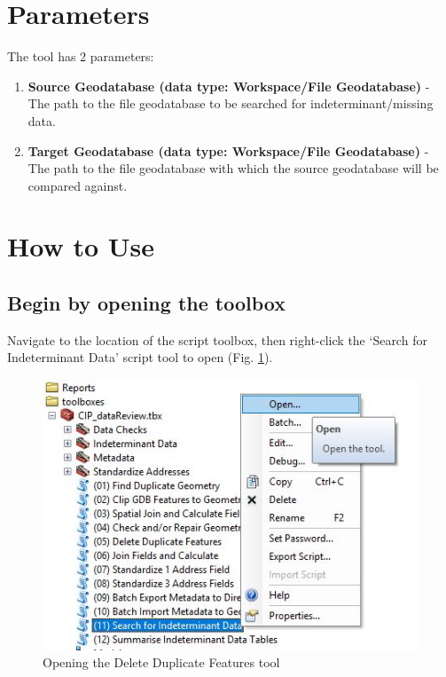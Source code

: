\documentclass[openany]{book}
\providecommand{\tightlist}{%
  \setlength{\itemsep}{0pt}\setlength{\parskip}{0pt}}
\theoremstyle{definition}
\theoremstyle{definition}
\theoremstyle{definition}
\theoremstyle{remark}
\begin{document}
\section{Parameters}\label{parameters-7}

The tool has 2 parameters:

\begin{enumerate}
\def\labelenumi{\arabic{enumi}.}
\tightlist
\item
  \textbf{Source Geodatabase (data type: Workspace/File Geodatabase)} -
  The path to the file geodatabase to be searched for
  indeterminant/missing data.
\item
  \textbf{Target Geodatabase (data type: Workspace/File Geodatabase)} -
  The path to the file geodatabase with which the source geodatabase
  will be compared against.
\end{enumerate}

\section{How to Use}\label{how-to-use-7}

\subsection{Begin by opening the
toolbox}\label{begin-by-opening-the-toolbox-7}

Navigate to the location of the script toolbox, then right-click the
`Search for Indeterminant Data' script tool to open (Fig.
\ref{fig:indtSearchopen}).

\begin{figure}[H]

{\centering \includegraphics{figures/indtSearch-open} 

}

\caption{Opening the Delete Duplicate Features tool}\label{fig:indtSearchopen}
\end{figure}
\end{document}
